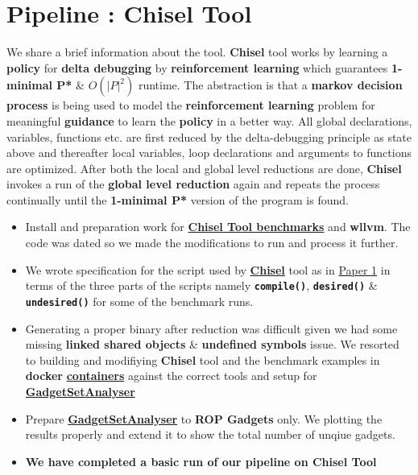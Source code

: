\documentclass{article} %
\begin{document}
\section*{\color{darkmidnightblue} Pipeline : Chisel Tool} 
We share a brief information about the tool. \textbf{Chisel} tool works by learning a \textbf{policy} for \textbf{delta debugging} by \textbf{reinforcement learning} which guarantees \textbf{1-minimal P*} \& $\textbf{$O(|P|^2)$}$ runtime. The abstraction is that a \textbf{markov decision process} is being used to model the \textbf{reinforcement learning} problem for meaningful \textbf{guidance} to learn the \textbf{policy} in a better way. All global declarations, variables, functions etc. are first reduced by the delta-debugging principle as state above and thereafter local variables, loop declarations and arguments to functions are optimized. After both the local and global level reductions are done, \textbf{Chisel} invokes a run of the \textbf{global level reduction} again and repeats the process continually until the \textbf{1-minimal P*} version of the program is found. 
\begin{itemize}
	\item Install and preparation work for \textbf{\href{https://github.com/lahiri-phdworks/chisel-bench}{Chisel Tool benchmarks}} and \textbf{wllvm}. The code was dated so we made the modifications to run and process it further. 
	\item We wrote specification for the script used by \textbf{\href{https://github.com/aspire-project/chisel}{Chisel}} tool as in \href{https://dl.acm.org/doi/10.1145/3243734.3243838}{Paper 1} in terms of the three parts of the scripts namely \textbf{\texttt{compile()}}, \textbf{\texttt{desired()}} \& \texttt{\textbf{undesired()}} for some of the benchmark runs.
	\item Generating a proper binary after reduction was difficult given we had some missing \textbf{linked shared objects} \& \textbf{undefined symbols} issue. We resorted to building and modifiying \textbf{Chisel} tool and the benchmark examples in \textbf{docker} \textbf{\href{https://hub.docker.com/r/prodrelworks/chisel-tool}{containers}} against the correct tools and setup for \textbf{\href{https://github.com/michaelbrownuc/GadgetSetAnalyzer}{GadgetSetAnalyser}}
	\item Prepare \textbf{\href{https://github.com/michaelbrownuc/GadgetSetAnalyzer}{GadgetSetAnalyser}} to \textbf{ROP Gadgets} only. We plotting the results properly and extend it to show the total number of unqiue gadgets. 
	\item \textbf{\color{ao(english)} We have completed a basic run of our pipeline on Chisel Tool}
\end{itemize}
\end{document}

